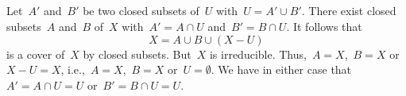 \subsection{}

Let~$A'$ and~$B'$ be two closed subsets of~$U$ with~$U = A' ∪ B'$.
There exist closed subsets~$A$ and~$B$ of~$X$ with~$A' = A ∩ U$ and~$B' = B ∩ U$.
It follows that
\[
	X = A ∪ B ∪ (X - U)
\]
is a cover of~$X$ by closed subsets.
But~$X$ is irreducible.
Thus,~$A = X$,~$B = X$ or~$X - U = X$, i.e.,~$A = X$,~$B = X$ or~$U = ∅$.
We have in either case that~$A' = A ∩ U = U$ or~$B' = B ∩ U = U$.
